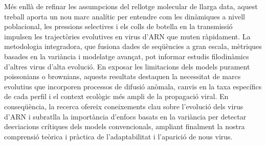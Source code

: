 Més enllà de refinar les assumpcions del rellotge molecular de llarga data, aquest treball aporta un nou marc analític per entendre com les dinàmiques a nivell poblacional, les pressions selectives i els colls de botella en la transmissió impulsen les trajectòries evolutives en virus d'ARN que muten ràpidament. La metodologia integradora, que fusiona dades de seqüències a gran escala, mètriques basades en la variància i modelatge avançat, pot informar estudis filodinàmics d'altres virus d'alta evolució. En exposar les limitacions dels models purament poissonians o brownians, aquests resultats destaquen la necessitat de marcs evolutius que incorporen processos de difusió anòmala, canvis en la taxa específics de cada perfil i el context ecològic més ampli de la propagació viral. En conseqüència, la recerca ofereix coneixements clau sobre l'evolució dels virus d'ARN i subratlla la importància d'enfocs basats en la variància per detectar desviacions crítiques dels models convencionals, ampliant finalment la nostra comprensió teòrica i pràctica de l'adaptabilitat i l'aparició de nous virus.


\vfill